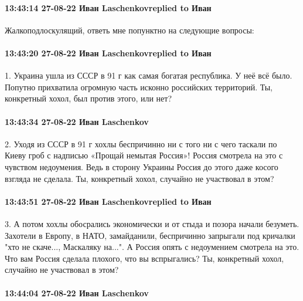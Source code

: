  
 
 
 
 

\paragraph{13:43:14 27-08-22 Иван Laschenkovreplied to Иван}

Жалкоподлоскулящий, ответь мне попунктно на следующие вопросы:

\paragraph{13:43:20 27-08-22 Иван Laschenkovreplied to Иван}

1. Украина ушла из СССР в 91 г как самая богатая республика. У неё всё было. Попутно прихватила огромную часть исконно российских территорий.
Ты, конкретный хохол, был против этого, или нет?

\paragraph{13:43:34 27-08-22 Иван Laschenkov}

2. Уходя из СССР в 91 г хохлы беспричинно ни с того ни с чего таскали по Киеву гроб с надписью «Прощай немытая Россия»!
Россия смотрела на это с чувством недоумения. Ведь в сторону Украины Россия до этого даже косого взгляда не сделала.
Ты, конкретный хохол, случайно не участвовал в этом?

\paragraph{13:43:51 27-08-22 Иван Laschenkovreplied to Иван}

3. А потом хохлы обосрались экономически и от стыда и позора начали безуметь. Захотели в Европу, в НАТО, замайданили, беспричинно запрыгали под кричалки "хто не скаче..., Маскаляку на...".
А Россия опять с недоумением смотрела на это. Что вам Россия сделала плохого, что вы вспрыгались?
Ты, конкретный хохол, случайно не участвовал в этом?

\paragraph{13:44:04 27-08-22 Иван Laschenkov}

